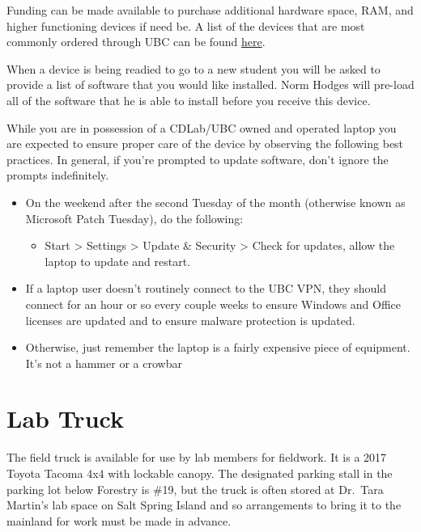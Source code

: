 \documentclass[
]{book}
\providecommand{\tightlist}{%
  \setlength{\itemsep}{0pt}\setlength{\parskip}{0pt}}
\begin{document}
Funding can be made available to purchase additional hardware space, RAM, and higher functioning devices if need be. A list of the devices that are most commonly ordered through UBC can be found \href{https://it.ubc.ca/services/desktop-print-services/desktop-and-laptop-setup-and-support/desktop-laptop-and-hardware}{here}.

When a device is being readied to go to a new student you will be asked to provide a list of software that you would like installed. Norm Hodges will pre-load all of the software that he is able to install before you receive this device.

While you are in possession of a CDLab/UBC owned and operated laptop you are expected to ensure proper care of the device by observing the following best practices. In general, if you're prompted to update software, don't ignore the prompts indefinitely.

\begin{itemize}
\tightlist
\item
  On the weekend after the second Tuesday of the month (otherwise known as Microsoft Patch Tuesday), do the following:

  \begin{itemize}
  \tightlist
  \item
    Start \textgreater{} Settings \textgreater{} Update \& Security \textgreater{} Check for updates, allow the laptop to update and restart.
  \end{itemize}
\item
  If a laptop user doesn't routinely connect to the UBC VPN, they should connect for an hour or so every couple weeks to ensure Windows and Office licenses are updated and to ensure malware protection is updated.
\item
  Otherwise, just remember the laptop is a fairly expensive piece of equipment. It's not a hammer or a crowbar
\end{itemize}

\hypertarget{labtruck}{%
\section*{Lab Truck}\label{labtruck}}

The field truck is available for use by lab members for fieldwork. It is a 2017 Toyota Tacoma 4x4 with lockable canopy. The designated parking stall in the parking lot below Forestry is \#19, but the truck is often stored at Dr.~Tara Martin's lab space on Salt Spring Island and so arrangements to bring it to the mainland for work must be made in advance.
\end{document}
